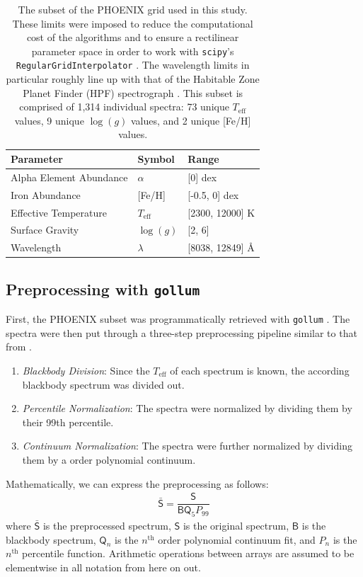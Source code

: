 \documentclass[twocolumn]{aastex631}
\begin{document}
\begin{table}[h!]
    \centering
    \begin{tabular}{lll}
        \hline
        \bf{Parameter} & \bf{Symbol} & \bf{Range}\\
        \hline
        Alpha Element Abundance & $\alpha$ & [0] dex\\
        Iron Abundance & [Fe/H] & [-0.5, 0] dex\\
        Effective Temperature & $T_{\mathrm{eff}}$ & [2300, 12000] K\\
        Surface Gravity & $\log(g)$ & [2, 6]\\
        Wavelength & $\lambda$ & [8038, 12849] \AA\\
        \hline
    \end{tabular}
    \caption{The subset of the PHOENIX grid used in this study. 
    These limits were imposed to reduce the computational cost of the algorithms and to ensure a rectilinear parameter space in order to work with \texttt{scipy}'s \texttt{RegularGridInterpolator} \citep{scipy}. 
    The wavelength limits in particular roughly line up with that of the Habitable Zone Planet Finder (HPF) spectrograph \citep{HPF}. 
    This subset is comprised of 1,314 individual spectra: 73 unique $T_{\mathrm{eff}}$ values, 9 unique $\log(g)$ values, and 2 unique [Fe/H] values.}
    \label{tab:table1}
\end{table}

\subsection{Preprocessing with \texttt{gollum}}
First, the PHOENIX subset was programmatically retrieved with \texttt{gollum} \citep{gollum}. The spectra were then put through a 
three-step preprocessing pipeline similar to that from \citealt{blase}.
\begin{enumerate}
    \item \textit{Blackbody Division}: Since the $T_{\mathrm{eff}}$ of each spectrum is known, the according blackbody spectrum was divided out.
    \item \textit{Percentile Normalization}: The spectra were normalized by dividing them by their 99th percentile.
    \item \textit{Continuum Normalization}: The spectra were further normalized by dividing them by a  order polynomial continuum.
\end{enumerate}
Mathematically, we can express the preprocessing as follows:
\begin{gather}
    \mathsf{\bar{S}} = \dfrac{\mathsf{S}}{\mathsf{B}\mathsf{Q}_5P_{99}}
\end{gather}
where $\mathsf{\bar{S}}$ is the preprocessed spectrum, $\mathsf{S}$ is the original spectrum,  $\mathsf{B}$ is the blackbody spectrum, $\mathsf{Q}_n$ is the $n^\mathrm{th}$ order polynomial continuum fit, and $P_n$ is the $n^\mathrm{th}$ percentile function. 
Arithmetic operations between arrays are assumed to be elementwise in all notation from here on out.
\end{document}
